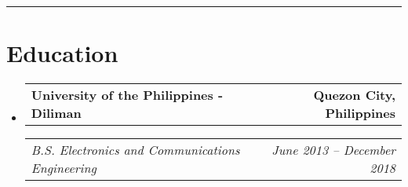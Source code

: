 \documentclass[11pt,letterpaper]{article}
\makeatletter
\newcommand{\headerrow}[2]
{\begin{tabular*}{\linewidth}{l@{\extracolsep{\fill}}r}
#1 &
#2 \\
\end{tabular*}}
\makeatother
\begin{document}
\hrule
\section*{\Large Education}

\begin{itemize}[leftmargin=1em]
	\parskip=0.1em
		
	\item
	      \headerrow
	      {\textbf{University of the Philippines - Diliman}}
	      {\textbf{Quezon City, Philippines}}
	      \headerrow
	      {\emph{B.S. Electronics and Communications Engineering}}
	      {\emph{June 2013 -- December 2018}}
	      	      
\end{itemize}
\end{document}
